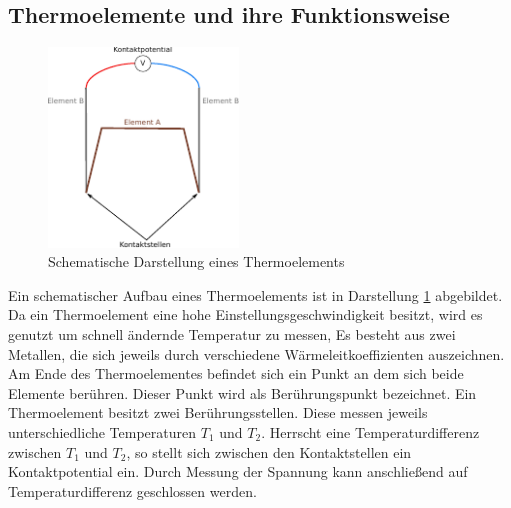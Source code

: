 \subsection{Thermoelemente und ihre Funktionsweise} %
\begin{figure}
  \centering
  \includegraphics[width=0.45\textwidth]{bilder/thermoelement.pdf}
  \caption{Schematische Darstellung eines Thermoelements}
  \label{fig:thermo}
\end{figure}
Ein schematischer Aufbau eines Thermoelements ist in  Darstellung \ref{fig:thermo} %
abgebildet.
Da ein Thermoelement eine hohe Einstellungsgeschwindigkeit besitzt,
wird es genutzt um schnell ändernde Temperatur zu messen, %
Es besteht aus zwei Metallen, die sich jeweils durch
verschiedene Wärmeleitkoeffizienten auszeichnen.
Am Ende des Thermoelementes befindet sich ein Punkt an dem sich
beide Elemente berühren. Dieser Punkt wird als Berührungspunkt
bezeichnet.
Ein Thermoelement besitzt zwei Berührungsstellen.
Diese messen jeweils unterschiedliche Temperaturen $T_1$ und $T_2$.
Herrscht eine Temperaturdifferenz zwischen $T_1$ und $T_2$, so
stellt sich zwischen den Kontaktstellen ein Kontaktpotential %
ein.
Durch Messung der Spannung kann anschließend auf
Temperaturdifferenz geschlossen werden. %